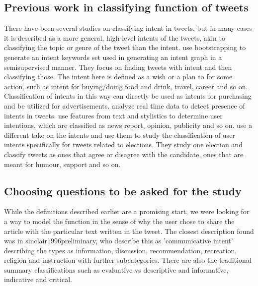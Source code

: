 \subsection{Previous work in classifying function of tweets}
There have been several studies on classifying intent in tweets, but in many cases it is described as a more general, high-level intents of the tweets, akin to classifying the topic or genre of the tweet than the intent. \cite{wang2015mining} use bootstrapping to generate an intent keywords set used in generating an intent graph in a semisupervised manner. They focus on finding tweets with intent and then classifying those. The intent here is defined as a wish or a plan to for some action, such as intent for buying/doing food and drink, travel, career and so on. Classification of intents in this way can directly be used as intents for purchasing and be utilized for advertisements.  \citet{banerjee2012towards} analyze real time data to detect presence of intents in tweets. \citet{gomez2014content} use features from text and stylistics to determine user intentions, which are classified as news report, opinion, publicity and so on. \cite{mohammad2013identifying} use a different take on the intents and use them to study the classification of user intents specifically for tweets related to elections. They study one election and classify tweets as ones that agree or disagree with the candidate, ones that are meant for humour, support and so on. 


\subsection{Choosing questions to be asked for the study}

While the definitions described earlier are a promising start, we were looking for a way to model the function in the sense of why the user chose to share the article with the particular text written in the tweet. The closest description found was in {sinclair1996preliminary}, who describe this as 'communicative intent' describing the types as information, discussion, recommendation, recreation, religion and instruction with further subcategories. There are also the traditional summary classifications such as evaluative vs descriptive and informative, indicative and critical. 

